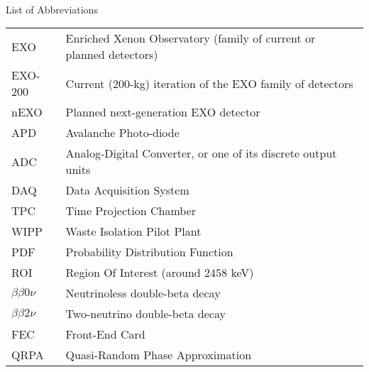 
\renewcommand{\baselinestretch}{1}
\small\normalsize
\hbox{\ }

\vspace{-4em}

\begin{center}
\large{List of Abbreviations}
\end{center} 

\vspace{3pt}

\begin{tabular}{ll}
EXO & Enriched Xenon Observatory (family of current or planned detectors) \\
EXO-200 & Current (200-kg) iteration of the EXO family of detectors \\
nEXO & Planned next-generation EXO detector \\
APD & Avalanche Photo-diode \\
ADC & Analog-Digital Converter, or one of its discrete output units \\
DAQ & Data Acquisition System \\
TPC & Time Projection Chamber \\
WIPP & Waste Isolation Pilot Plant \\
PDF & Probability Distribution Function \\
ROI & Region Of Interest (around $2458$ keV) \\
$\beta\beta 0\nu$ & Neutrinoless double-beta decay \\
$\beta\beta 2\nu$ & Two-neutrino double-beta decay \\
FEC & Front-End Card \\
QRPA & Quasi-Random Phase Approximation
\end{tabular}
